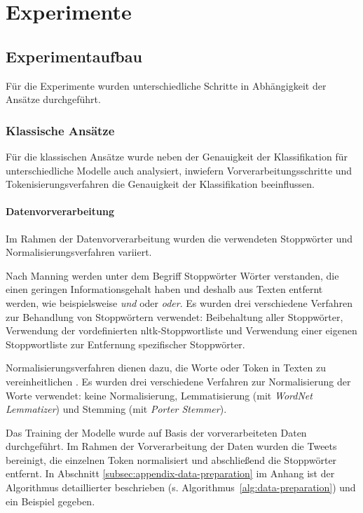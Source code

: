 \section{Experimente}

\subsection{Experimentaufbau}

Für die Experimente wurden unterschiedliche Schritte in Abhängigkeit der Ansätze durchgeführt.

\subsubsection{Klassische Ansätze}\label{subsubsec:experimente-klassische-ansaetze}

Für die klassischen Ansätze wurde neben der Genauigkeit der Klassifikation für unterschiedliche Modelle auch analysiert, inwiefern Vorverarbeitungsschritte und Tokeni\-sie\-rungs\-verfahren die Genauigkeit der Klassifikation beeinflussen.

\paragraph{Datenvorverarbeitung}
Im Rahmen der Datenvorverarbeitung wurden die verwendeten Stoppwörter und Normalisierungsverfahren variiert.

Nach Manning \cite[S.27]{manning2009introduction} werden unter dem Begriff Stoppwörter Wörter verstanden, die einen geringen Informationsgehalt haben und deshalb aus Texten entfernt werden, wie beispielsweise \textit{und} oder \textit{oder}.
Es wurden drei verschiedene Verfahren zur Behandlung von Stoppwörtern verwendet: Beibehaltung aller Stoppwörter, Verwendung der vordefinierten \gls{nltk}-Stoppwortliste und Verwendung einer eigenen Stoppwortliste zur Entfernung spezifischer Stoppwörter.

Normalisierungsverfahren dienen dazu, die Worte oder Token in Texten zu vereinheitlichen \cite[S.28]{manning2009introduction}.
Es wurden drei verschiedene Verfahren zur Normalisierung der Worte verwendet: keine Normalisierung, Lemmatisierung (mit \textit{WordNet Lemmatizer}) und Stemming (mit \textit{Porter Stemmer}).

Das Training der Modelle wurde auf Basis der vorverarbeiteten Daten durchgeführt.
Im Rahmen der Vorverarbeitung der Daten wurden die Tweets bereinigt, die einzelnen Token normalisiert und abschließend die Stoppwörter entfernt.
In Abschnitt \ref{subsec:appendix-data-preparation} im Anhang ist der Algorithmus detaillierter beschrieben (s. Algorithmus~\ref{alg:data-preparation}) und ein Beispiel gegeben.

